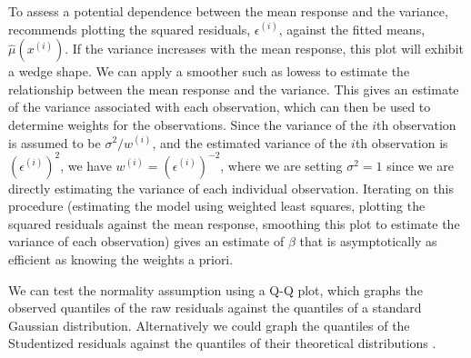 \documentclass[12pt]{article}
\begin{document}
To assess a potential dependence between the mean response and the variance, \cite[\S~10.4.2]{Seber:2003} recommends plotting the squared residuals, $\epsilon^{(i)}$, against the fitted means, $\hat{\mu}(x^{(i)})$. If the variance increases with the mean response, this plot will exhibit a wedge shape. We can apply a smoother such as lowess \cite{Cleveland:1979} to estimate the relationship between the mean response and the variance. This gives an estimate of the variance associated with each observation, which can then be used to determine weights for the observations. Since the variance of the $i$th observation is assumed to be $\sigma^2 / w^{(i)}$, and the estimated variance of the $i$th observation is $(\epsilon^{(i)})^2$, we have $w^{(i)} = (\epsilon^{(i)})^{-2}$, where we are setting $\sigma^2=1$ since we are directly estimating the variance of each individual observation.  Iterating on this procedure (estimating the model using weighted least squares, plotting the squared residuals against the mean response, smoothing this plot to estimate the variance of each observation) gives an estimate of $\beta$ that is asymptotically as efficient as knowing the weights a priori.

We can test the normality assumption using a Q-Q plot, which graphs the observed quantiles of the raw residuals against the quantiles of a standard Gaussian distribution. Alternatively we could graph the quantiles of the Studentized residuals against the quantiles of their theoretical distributions \cite[\S~10.5.1]{Seber:2003}.
\end{document}
